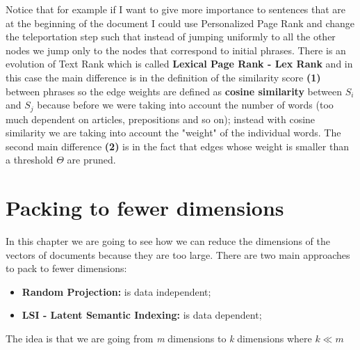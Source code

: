 Notice that for example if I want to give more importance to sentences that are at the beginning of the document I could use Personalized Page Rank and change the teleportation step such that instead of jumping uniformly to all the other nodes we jump only to the nodes that correspond to initial phrases.\newline
There is an evolution of Text Rank which is called \textbf{Lexical Page Rank - Lex Rank} and in this case the main difference is in the definition of the similarity score \textbf{(1)} between phrases so the edge weights are defined as \textbf{cosine similarity} between $S_i$ and $S_j$ because before we were taking into account the number of words (too much dependent on articles, prepositions and so on); instead with cosine similarity we are taking into account the "weight" of the individual words. The second main difference \textbf{(2)} is in the fact that edges whose weight is smaller than a threshold $\Theta$ are pruned.\newline
\chapter{Packing to fewer dimensions}
In this chapter we are going to see how we can reduce the dimensions of the vectors of documents because they are too large.\newline
There are two main approaches to pack to fewer dimensions:
\begin{itemize}
    \item \textbf{Random Projection:} is data independent;
    \item \textbf{LSI - Latent Semantic Indexing:} is data dependent;
\end{itemize}
The idea is that we are going from \textit{m} dimensions to \textit{k} dimensions where $k \ll m$
